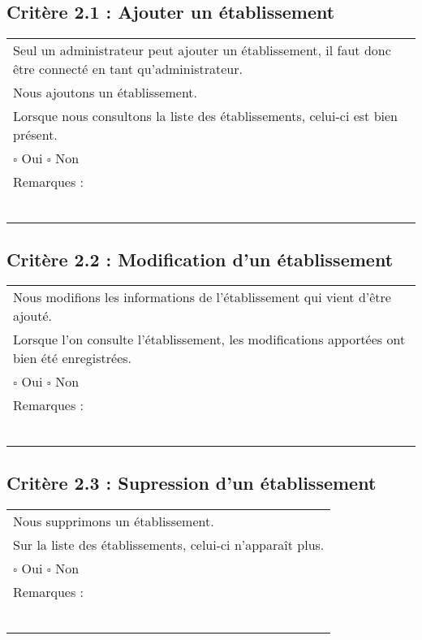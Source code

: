   	\subsection*{Critère 2.1 : Ajouter un établissement}
  		\begin{center}
    	 		\begin{tabular}[h]{|p{}|}
			\hline
				Seul un administrateur peut ajouter un établissement, il faut donc être connecté en tant qu'administrateur.\\
				Nous ajoutons un établissement. \\
				Lorsque nous consultons la liste des établissements, celui-ci est bien présent. \\
						
				
				$\square$ Oui  \hfill \hfill $\square$ Non \\\hline Remarques : \\ ~\\
			 \\\hline
     		\end{tabular}
  		\end{center}	
  		
  	\subsection*{Critère 2.2 : Modification d'un établissement}
  		\begin{center}
    	 		\begin{tabular}[h]{|p{}|}
			\hline
				Nous modifions les informations de l'établissement qui vient d'être ajouté.\\
				Lorsque l'on consulte l'établissement, les modifications apportées ont bien été enregistrées. \\			
				
				$\square$ Oui  \hfill \hfill $\square$ Non \\\hline Remarques : \\ ~\\
			 \\\hline
     		\end{tabular}
  		\end{center}	
  		
  	\subsection*{Critère 2.3 : Supression d'un établissement}
  		\begin{center}
    	 		\begin{tabular}[h]{|p{}|}
			\hline
				Nous supprimons un établissement. \\
				Sur la liste des établissements, celui-ci n'apparaît plus. \\
				
				$\square$ Oui  \hfill \hfill $\square$ Non \\\hline Remarques : \\ ~\\
			 \\\hline
     		\end{tabular}
  		\end{center}	
  		
